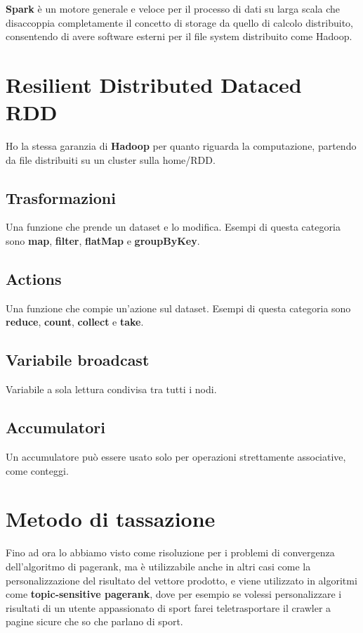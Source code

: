 \documentclass[\main/main.tex]{subfiles}
\begin{document}
\textbf{Spark} è un motore generale e veloce per il processo di dati su larga scala che disaccoppia completamente il concetto di storage da quello di calcolo distribuito, consentendo di avere software esterni per il file system distribuito come Hadoop.

\section{Resilient Distributed Dataced RDD}
Ho la stessa garanzia di \textbf{Hadoop} per quanto riguarda la computazione, partendo da file distribuiti su un cluster sulla home/RDD.

\subsection{Trasformazioni}
Una funzione che prende un dataset e lo modifica. Esempi di questa categoria sono \textbf{map}, \textbf{filter}, \textbf{flatMap} e \textbf{groupByKey}.

\subsection{Actions}
Una funzione che compie un'azione sul dataset. Esempi di questa categoria sono \textbf{reduce}, \textbf{count}, \textbf{collect} e \textbf{take}.

\subsection{Variabile broadcast}
Variabile a sola lettura condivisa tra tutti i nodi.

\subsection{Accumulatori}
Un accumulatore può essere usato solo per operazioni strettamente associative, come conteggi.

\section{Metodo di tassazione}
Fino ad ora lo abbiamo visto come risoluzione per i problemi di convergenza dell'algoritmo di pagerank, ma è utilizzabile anche in altri casi come la personalizzazione del risultato del vettore prodotto, e viene utilizzato in algoritmi come \textbf{topic-sensitive pagerank}, dove per esempio se volessi personalizzare i risultati di un utente appassionato di sport farei teletrasportare il crawler a pagine sicure che so che parlano di sport.
\end{document}
